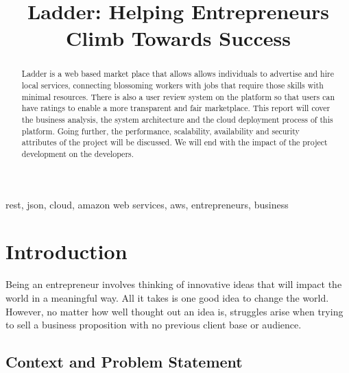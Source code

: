\documentclass[conference]{IEEEtran}
\begin{document}
\title{Ladder: Helping Entrepreneurs Climb Towards Success}

\author{
\and
{}
}

\maketitle

\begin{abstract}
Ladder is a web based market place that allows allows individuals to advertise and hire local services, connecting blossoming workers with jobs that require those skills with minimal resources. There is also a user review system on the platform so that users can have ratings to enable a more transparent and fair marketplace. This report will cover the business analysis, the system architecture and the cloud deployment process of this platform. Going further, the performance, scalability, availability and security attributes of the project will be discussed. We will end with the impact of the project development on the developers. 
\end{abstract}

\begin{IEEEkeywords}
rest, json, cloud, amazon web services, aws, entrepreneurs, business
\end{IEEEkeywords}

\section{Introduction}

Being an entrepreneur involves thinking of innovative ideas that will impact the world in a meaningful way. All it takes is one good idea to change the world. However, no matter how well thought out an idea is, struggles arise when trying to sell a business proposition with no previous client base or audience. 

\subsection{Context and Problem Statement}
\end{document}
